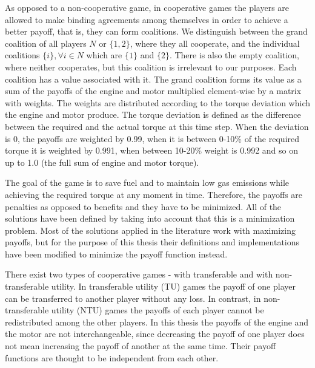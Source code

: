 As opposed to a non-cooperative game, in cooperative games the players are allowed to make binding agreements among themselves in order to achieve a better payoff, that is, they can form coalitions. We distinguish between the grand coalition of all players $N$ or $\{1,2\}$, where they all cooperate, and the individual coalitions $\{i\}, \forall i \in N$ which are $\{1\}$ and $\{2\}$. There is also the empty coalition, where neither cooperates, but this coalition is irrelevant to our purposes. Each coalition has a value associated with it. The grand coalition forms its value as a sum of the payoffs of the engine and motor multiplied element-wise by a matrix with weights. The weights are distributed according to the torque deviation which the engine and motor produce. The torque deviation is defined as the difference between the required and the actual torque at this time step. When the deviation is 0, the payoffs are weighted by 0.99, when it is between 0-10\% of the required torque it is weighted by 0.991, when between 10-20\% weight is 0.992 and so on up to 1.0 (the full sum of engine and motor torque).


The goal of the game is to save fuel and to maintain low gas emissions while achieving the required torque at any moment in time. Therefore, the payoffs are penalties as opposed to benefits and they have to be minimized. All of the solutions have been defined by taking into account that this is a minimization problem. Most of the solutions applied in the literature work with maximizing payoffs, but for the purpose of this thesis their definitions and implementations have been modified to minimize the payoff function instead. 


There exist two types of cooperative games - with transferable and with non-transferable utility. In transferable utility (TU) games the payoff of one player can be transferred to another player without any loss. In contrast, in non-transferable utility (NTU) games the payoffs of each player cannot be redistributed among the other players. In this thesis the payoffs of the engine and the motor are not interchangeable, since decreasing the payoff of one player does not mean increasing the payoff of another at the same time. Their payoff functions are thought to be independent from each other.

